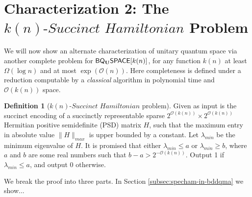 \documentclass[11pt]{article}
\theoremstyle{definition}
\theoremstyle{remark}
\theoremstyle{definition}
\newtheorem{definition}{Definition}
\newcommand\QMAexp{{\sf{PreciseQMA}}}
\newcommand\spechamiltonian[1]{#1\textit{-Succinct Hamiltonian}}
\newcommand{\classfont}{\sf}
\newcommand{\Unitary}{\mathbf{U}}
\newcommand{\unitaryBQSPACE}[1]{{\classfont{BQ}_\Unitary\classfont{SPACE}}[#1]}
\newcommand\bigoh{\mathcal{O}}
\begin{document}
\section{Characterization 2: The $\spechamiltonian{k(n)}$ Problem}
We will now show an alternate characterization of unitary quantum space via another complete problem for $\unitaryBQSPACE{k(n)}$, for any function $k(n)$ at least $\Omega(\log n)$ and at most $\exp(\bigoh (n))$. Here completeness is defined under a reduction computable by a \emph{classical} algorithm in polynomial time and $\mathcal{O}(k(n))$ space.
\begin{definition}[$\spechamiltonian{k(n)}$ problem]
Given as input is the succinct encoding of a succinctly representable sparse $2^{\mathcal{O}(k(n))} \times 2^{\mathcal{O}(k(n))}$ Hermitian positive semidefinite (PSD) matrix $H$, such that the maximum entry in absolute value $\|H\|_{max}$ is upper bounded by a constant. Let $\lambda_{min}$ be the minimum eigenvalue of $H$. It is promised that either $\lambda_{min} \le a$ or $\lambda_{min} \ge b$, where $a$ and $b$ are some real numbers such that $b-a > 2^{-\mathcal{O}(k(n))}$. Output 1 if $\lambda_{min} \le a$, and output 0 otherwise.
\end{definition}

We break the proof into three parts. In Section \ref{subsec:specham-in-bddqma} we show...
\end{document}
